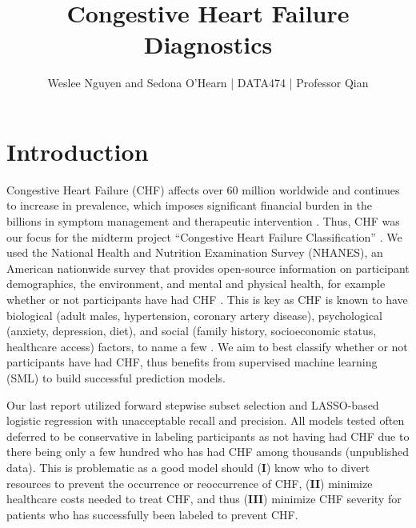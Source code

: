 \documentclass{article}
\title{Congestive Heart Failure Diagnostics \vspace{-2ex}}
\author{Weslee Nguyen and Sedona O'Hearn | DATA474 | Professor Qian}
\date{}
\begin{document}
\maketitle
\vspace{-20mm}
\section*{Introduction}
\vspace{-6mm}
Congestive Heart Failure (CHF) affects over 60 million worldwide and continues to increase in prevalence, which imposes significant financial burden in the billions in symptom management and therapeutic intervention \citep{CHFManagement2023}. Thus, CHF was our focus for the midterm project ``Congestive Heart Failure Classification'' \citep{Midterm2026}. We used the National Health and Nutrition Examination Survey (NHANES), an American nationwide survey that provides open-source information on participant demographics, the environment, and mental and physical health, for example whether or not participants have had CHF \citep{CHF-NHANESA2024}. This is key as CHF is known to have biological (adult males, hypertension, coronary artery disease), psychological (anxiety, depression, diet), and social (family history, socioeconomic status, healthcare access) factors, to name a few \citep{CHFPathophysiology2021, CHF-BPSM2025}. We aim to best classify whether or not participants have had CHF, thus benefits from supervised machine learning (SML) to build successful prediction models.

Our last report utilized forward stepwise subset selection and LASSO-based logistic regression with unacceptable recall and precision. All models tested often deferred to be conservative in labeling participants as not having had CHF due to there being only a few hundred who has had CHF among thousands (unpublished data). This is problematic as a good model should (\textbf{I}) know who to divert resources to prevent the occurrence or reoccurrence of CHF, (\textbf{II}) minimize healthcare costs needed to treat CHF, and thus (\textbf{III}) minimize CHF severity for patients who has successfully been labeled to prevent CHF. 
\end{document}

